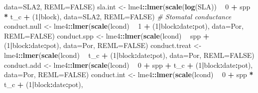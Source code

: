 \documentclass[]{scrartcl}
\newenvironment{Shaded}{\begin{snugshade}}{\end{snugshade}}
\newcommand{\CommentTok}[1]{\textcolor[rgb]{0.56,0.35,0.01}{\textit{#1}}}
\newcommand{\DataTypeTok}[1]{\textcolor[rgb]{0.13,0.29,0.53}{#1}}
\newcommand{\DecValTok}[1]{\textcolor[rgb]{0.00,0.00,0.81}{#1}}
\newcommand{\KeywordTok}[1]{\textcolor[rgb]{0.13,0.29,0.53}{\textbf{#1}}}
\newcommand{\NormalTok}[1]{#1}
\newcommand{\OperatorTok}[1]{\textcolor[rgb]{0.81,0.36,0.00}{\textbf{#1}}}
\newcommand{\OtherTok}[1]{\textcolor[rgb]{0.56,0.35,0.01}{#1}}
\newcommand{\StringTok}[1]{\textcolor[rgb]{0.31,0.60,0.02}{#1}}
\begin{document}
\begin{Shaded}
\begin{Highlighting}[]
{{{{{{{{{{{{                          \DataTypeTok{data=}\NormalTok{SLA2, }\DataTypeTok{REML=}\OtherTok{FALSE}\NormalTok{)}
\NormalTok{    sla.int <-}\StringTok{ }\NormalTok{lme4}\OperatorTok{::}\KeywordTok{lmer}\NormalTok{(}\KeywordTok{scale}\NormalTok{(}\KeywordTok{log}\NormalTok{(SLA)) }\OperatorTok{~}\StringTok{ }\DecValTok{0} \OperatorTok{+}\StringTok{ }\NormalTok{spp }\OperatorTok{*}\StringTok{ }\NormalTok{t_c }\OperatorTok{+}\StringTok{ }\NormalTok{(}\DecValTok{1}\OperatorTok{|}\NormalTok{block), }
                          \DataTypeTok{data=}\NormalTok{SLA2, }\DataTypeTok{REML=}\OtherTok{FALSE}\NormalTok{)}
  \CommentTok{# Stomatal conductance}
\NormalTok{    conduct.null <-}\StringTok{ }\NormalTok{lme4}\OperatorTok{::}\KeywordTok{lmer}\NormalTok{(}\KeywordTok{scale}\NormalTok{(lcond) }\OperatorTok{~}\StringTok{ }\DecValTok{1} \OperatorTok{+}\StringTok{ }\NormalTok{(}\DecValTok{1}\OperatorTok{|}\NormalTok{block}\OperatorTok{:}\NormalTok{date}\OperatorTok{:}\NormalTok{pot),}
                               \DataTypeTok{data=}\NormalTok{Por, }\DataTypeTok{REML=}\OtherTok{FALSE}\NormalTok{)}
\NormalTok{    conduct.spp <-}\StringTok{ }\NormalTok{lme4}\OperatorTok{::}\KeywordTok{lmer}\NormalTok{(}\KeywordTok{scale}\NormalTok{(lcond) }\OperatorTok{~}\StringTok{ }\NormalTok{spp }\OperatorTok{+}\StringTok{ }\NormalTok{(}\DecValTok{1}\OperatorTok{|}\NormalTok{block}\OperatorTok{:}\NormalTok{date}\OperatorTok{:}\NormalTok{pot), }
                              \DataTypeTok{data=}\NormalTok{Por, }\DataTypeTok{REML=}\OtherTok{FALSE}\NormalTok{)}
\NormalTok{    conduct.treat <-}\StringTok{ }\NormalTok{lme4}\OperatorTok{::}\KeywordTok{lmer}\NormalTok{(}\KeywordTok{scale}\NormalTok{(lcond) }\OperatorTok{~}\StringTok{ }\NormalTok{t_c }\OperatorTok{+}\StringTok{ }\NormalTok{(}\DecValTok{1}\OperatorTok{|}\NormalTok{block}\OperatorTok{:}\NormalTok{date}\OperatorTok{:}\NormalTok{pot), }
                                \DataTypeTok{data=}\NormalTok{Por, }\DataTypeTok{REML=}\OtherTok{FALSE}\NormalTok{)}
\NormalTok{    conduct.add <-}\StringTok{ }\NormalTok{lme4}\OperatorTok{::}\KeywordTok{lmer}\NormalTok{(}\KeywordTok{scale}\NormalTok{(lcond) }\OperatorTok{~}\StringTok{ }\DecValTok{0} \OperatorTok{+}\StringTok{ }\NormalTok{spp }\OperatorTok{+}\StringTok{ }\NormalTok{t_c }\OperatorTok{+}\StringTok{ }\NormalTok{(}\DecValTok{1}\OperatorTok{|}\NormalTok{block}\OperatorTok{:}\NormalTok{date}\OperatorTok{:}\NormalTok{pot), }
                              \DataTypeTok{data=}\NormalTok{Por, }\DataTypeTok{REML=}\OtherTok{FALSE}\NormalTok{)}
\NormalTok{    conduct.int <-}\StringTok{ }\NormalTok{lme4}\OperatorTok{::}\KeywordTok{lmer}\NormalTok{(}\KeywordTok{scale}\NormalTok{(lcond) }\OperatorTok{~}\StringTok{ }\DecValTok{0} \OperatorTok{+}\StringTok{ }\NormalTok{spp }\OperatorTok{*}\StringTok{ }\NormalTok{t_c  }\OperatorTok{+}\StringTok{ }\NormalTok{(}\DecValTok{1}\OperatorTok{|}\NormalTok{block}\OperatorTok{:}\NormalTok{date}\OperatorTok{:}\NormalTok{pot), }
}}}}}}}}}}}}
\end{Highlighting}
\end{Shaded}
\end{document}
